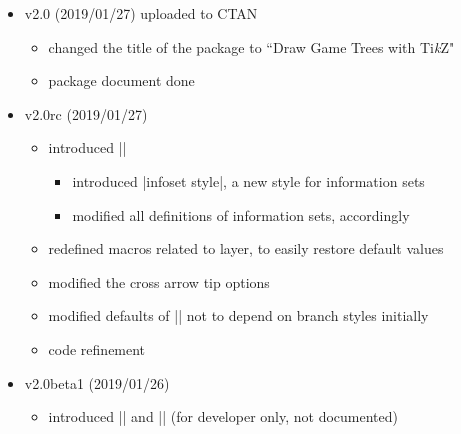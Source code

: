 \documentclass[a4paper,amsmath]{oblivoir}
\newcommand*\Tikz{Ti\textit{k}Z}
\begin{document}
\begin{itemize}
\begin{itemize}
  \end{itemize}
\item v2.0 (2019/01/27) uploaded to CTAN
  \begin{itemize}
  \item changed the title of the package to ``Draw Game Trees with \Tikz"
  \item package document done
  \end{itemize}
\item v2.0rc (2019/01/27)
  \begin{itemize}
  \item introduced |\setxtinfosetstyle|
    \begin{itemize}
    \item introduced |infoset style|, a new style for information sets
    \item modified all definitions of information sets, accordingly
    \end{itemize}
  \item redefined macros related to layer, to easily restore default values
  \item modified the cross arrow tip options
  \item modified defaults of |\setxtarrowtips| not to depend on branch styles initially
  \item code refinement
  \end{itemize}
\item v2.0beta1 (2019/01/26)
  \begin{itemize}
  \item introduced |\xtshowXpoints| and |\xtshowXcircles| (for developer only, not documented)
  \end{itemize}

\end{itemize}
\end{document}
